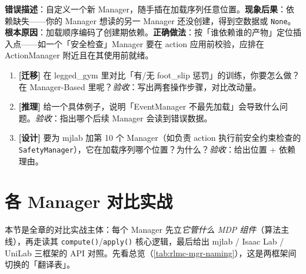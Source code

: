\begin{pitfall}
\textbf{错误描述}：自定义一个新 Manager，随手插在加载序列任意位置。\textbf{现象后果}：依赖缺失——你的 Manager 想读的另一 Manager 还没创建，得到空数据或 \verb|None|。\textbf{根本原因}：加载顺序编码了创建期依赖。\textbf{正确做法}：按「谁依赖谁的产物」定位插入点——如一个「安全检查」Manager 要在 action 应用前校验，应排在 ActionManager 附近且在其使用前就绪。
\end{pitfall}

\begin{practice}[本节练习]
\begin{enumerate}
  \item \textbf{[迁移]} 在 legged\_gym 里对比「有/无 foot\_slip 惩罚」的训练，你要怎么做？在 Manager-Based 里呢？\emph{验收}：写出两套操作步骤，对比改动量。
  \item \textbf{[推理]} 给一个具体例子，说明「EventManager 不最先加载」会导致什么问题。\emph{验收}：指出哪个后续 Manager 会读到错误数据。
  \item \textbf{[设计]} 要为 mjlab 加第 10 个 Manager（如负责 action 执行前安全约束检查的 \verb|SafetyManager|），它在加载序列哪个位置？为什么？\emph{验收}：给出位置 + 依赖理由。
\end{enumerate}
\end{practice}

\section{各 Manager 对比实战}
\label{sec:rlmc-mgr-managers}

本节是全章的对比实战主体：每个 Manager 先立\emph{它管什么 MDP 组件}（算法主线），再走读其 \verb|compute()|/\allowbreak\verb|apply()| 核心逻辑，最后给出 mjlab / Isaac Lab / UniLab 三框架的 API 对照。先看总览（\cref{tab:rlmc-mgr-naming}），这是两框架间切换的「翻译表」。

